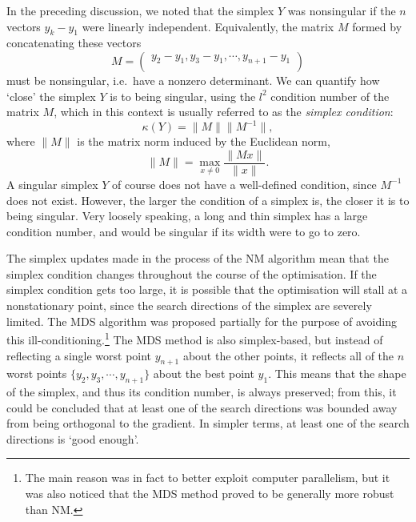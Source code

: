 In the preceding discussion, we noted that the simplex $Y$ was nonsingular if the $n$ vectors $y_k - y_1$ were linearly independent.
Equivalently, the matrix $M$ formed by concatenating these vectors
\begin{equation}
    \label{eq:simplex_matrix}
    M = \begin{pmatrix}
        y_2 - y_1, y_3 - y_1, \cdots, y_{n+1} - y_1 \\
    \end{pmatrix}
\end{equation}
must be nonsingular, i.e.\ have a nonzero determinant.
We can quantify how `close' the simplex $Y$ is to being singular, using the $l^2$ condition number of the matrix $M$, which in this context is usually referred to as the \textit{simplex condition}:
\begin{equation}
    \label{eq:simplex_condition}
    \kappa(Y) = \lVert M \rVert \lVert M^{-1} \rVert,
\end{equation}
where $\lVert M \rVert$ is the matrix norm induced by the Euclidean norm,
\begin{equation}
    \label{eq:matrix_norm}
    \lVert M \rVert = \max_{x \neq 0} \frac{\lVert Mx \rVert}{\lVert x \rVert}.
\end{equation}
A singular simplex $Y$ of course does not have a well-defined condition, since $M^{-1}$ does not exist.
However, the larger the condition of a simplex is, the closer it is to being singular.
Very loosely speaking, a long and thin simplex has a large condition number, and would be singular if its width were to go to zero.

The simplex updates made in the process of the NM algorithm mean that the simplex condition changes throughout the course of the optimisation.
If the simplex condition gets too large, it is possible that the optimisation will stall at a nonstationary point, since the search directions of the simplex are severely limited.
The MDS algorithm was proposed partially for the purpose of avoiding this ill-conditioning.\footnote{The main reason was in fact to better exploit computer parallelism, but it was also noticed that the MDS method proved to be generally more robust than NM.}
The MDS method is also simplex-based, but instead of reflecting a single worst point $y_{n+1}$ about the other points, it reflects all of the $n$ worst points $\{y_2, y_3, \cdots, y_{n+1}\}$ about the best point $y_1$.
This means that the shape of the simplex, and thus its condition number, is always preserved; from this, it could be concluded that at least one of the search directions was bounded away from being orthogonal to the gradient.\autocite{Torczon1989}
In simpler terms, at least one of the search directions is `good enough'.
